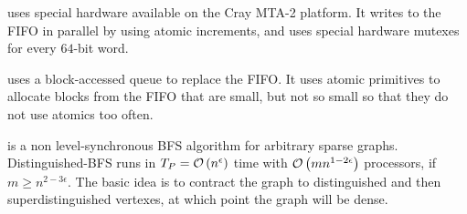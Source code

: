 \cite{cray-bfs} uses special hardware available on the Cray MTA-2 platform.  It writes to the FIFO in parallel by using atomic increments, and uses special hardware mutexes for every $64$-bit word.

\cite{block-queue-bfs} uses a block-accessed queue to replace the FIFO.  It uses atomic primitives to allocate blocks from the FIFO that are small, but not so small so that they do not use atomics too often.

\cite{distinguished-bfs} is a non level-synchronous BFS algorithm for arbitrary sparse graphs. Distinguished-BFS runs in $T_P = {\mathcal O}\left({n^\epsilon}\right)$ time with ${\mathcal O}\left({mn^{1-2\epsilon}}\right)$ processors, if $m\geq n^{2-3\epsilon}$.  The basic idea is to contract the graph to distinguished and then superdistinguished vertexes, at which point the graph will be dense.

